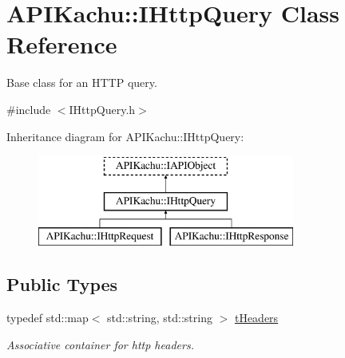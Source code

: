 \hypertarget{class_a_p_i_kachu_1_1_i_http_query}{}\section{A\+P\+I\+Kachu\+:\+:I\+Http\+Query Class Reference}
\label{class_a_p_i_kachu_1_1_i_http_query}


Base class for an H\+T\+TP query.  




{\ttfamily \#include $<$I\+Http\+Query.\+h$>$}

Inheritance diagram for A\+P\+I\+Kachu\+:\+:I\+Http\+Query\+:\begin{figure}[H]
\begin{center}
\leavevmode
\includegraphics[height=3.000000cm]{class_a_p_i_kachu_1_1_i_http_query}
\end{center}
\end{figure}
\subsection*{Public Types}
\begin{DoxyCompactItemize}
\item 
typedef std\+::map$<$ std\+::string, std\+::string $>$ \hyperlink{class_a_p_i_kachu_1_1_i_http_query_a15c3c9bc16ea76d23181bdc95e3ecca7}{t\+Headers}
\begin{DoxyCompactList}\small\item\em Associative container for http headers. \end{DoxyCompactList}\end{DoxyCompactItemize}

